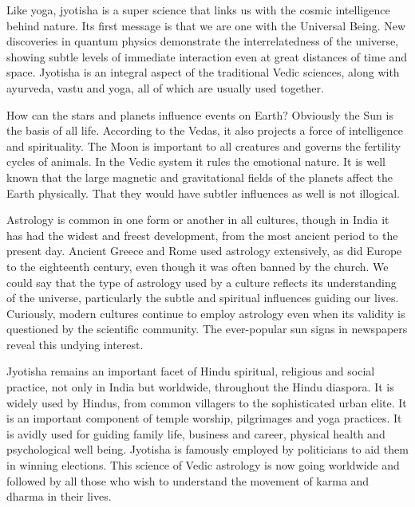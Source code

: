  

Like yoga, jyotisha is a super science that links us with the cosmic intelligence behind nature. Its first message is that we are one with the Universal Being. New discoveries in quantum physics demonstrate the interrelatedness of the universe, showing subtle levels of immediate interaction even at great distances of time and space. Jyotisha is an integral aspect of the traditional Vedic sciences, along with ayurveda, vastu and yoga, all of which are usually used together.

 

How can the stars and planets influence events on Earth? Obviously the Sun is the basis of all life. According to the Vedas, it also projects a force of intelligence and spirituality. The Moon is important to all creatures and governs the fertility cycles of animals. In the Vedic system it rules the emotional nature. It is well known that the large magnetic and gravitational fields of the planets affect the Earth physically. That they would have subtler influences as well is not illogical.

 

Astrology is common in one form or another in all cultures, though in India it has had the widest and freest development, from the most ancient period to the present day. Ancient Greece and Rome used astrology extensively, as did Europe to the eighteenth century, even though it was often banned by the church. We could say that the type of astrology used by a culture reflects its understanding of the universe, particularly the subtle and spiritual influences guiding our lives. Curiously, modern cultures continue to employ astrology even when its validity is questioned by the scientific community. The ever-popular sun signs in newspapers reveal this undying interest.

 

Jyotisha remains an important facet of Hindu spiritual, religious and social practice, not only in India but worldwide, throughout the Hindu diaspora. It is widely used by Hindus, from common villagers to the sophisticated urban elite. It is an important component of temple worship, pilgrimages and yoga practices. It is avidly used for guiding family life, business and career, physical health and psychological well being. Jyotisha is famously employed by politicians to aid them in winning elections. This science of Vedic astrology is now going worldwide and followed by all those who wish to understand the movement of karma and dharma in their lives.

